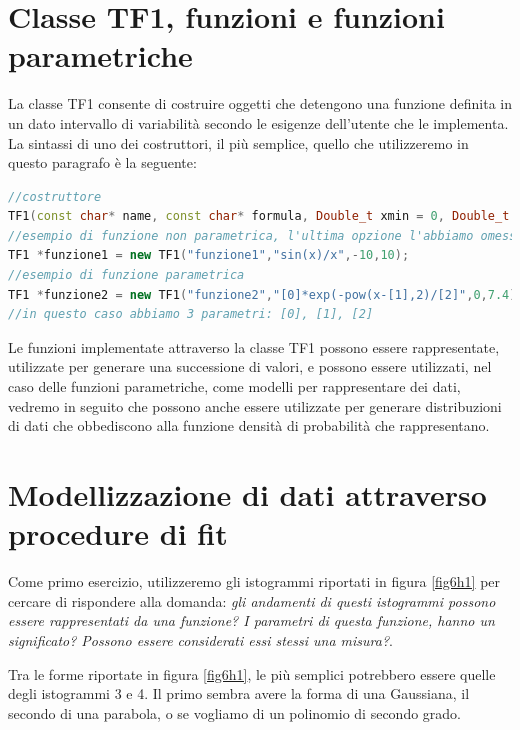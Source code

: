 \documentclass[11pt,fleqn]{book} %
\begin{document}
\section{Classe TF1, funzioni e funzioni parametriche}

La classe TF1 consente di costruire oggetti che detengono una funzione definita in un dato intervallo di variabilità secondo le esigenze dell'utente che le implementa. La sintassi di uno dei costruttori, il più semplice, quello che utilizzeremo in questo paragrafo è la seguente:

\begin{lstlisting}[language=c++]
//costruttore
TF1(const char* name, const char* formula, Double_t xmin = 0, Double_t xmax = 1, TF1::EAddToList addToGlobList = EAddToList::kDefault)
//esempio di funzione non parametrica, l'ultima opzione l'abbiamo omessa e lui assume quella di default.
TF1 *funzione1 = new TF1("funzione1","sin(x)/x",-10,10);
//esempio di funzione parametrica 
TF1 *funzione2 = new TF1("funzione2","[0]*exp(-pow(x-[1],2)/[2]",0,7.4);
//in questo caso abbiamo 3 parametri: [0], [1], [2]
\end{lstlisting}

Le funzioni implementate attraverso la classe TF1 possono essere rappresentate, utilizzate per generare una successione di valori, e possono essere utilizzati, nel caso delle funzioni parametriche, come modelli per rappresentare dei dati, vedremo in seguito che possono anche essere utilizzate  per generare distribuzioni di dati che obbediscono alla funzione densità di probabilità che rappresentano. 



\section{Modellizzazione di dati attraverso procedure di fit}

Come primo esercizio, utilizzeremo gli istogrammi riportati in figura \ref{fig6h1} per cercare di rispondere alla domanda: \textit{gli andamenti di questi istogrammi possono essere rappresentati da una funzione? I parametri di questa funzione, hanno un significato? Possono essere considerati essi stessi una misura?}.

Tra le forme riportate in figura \ref{fig6h1}, le più semplici potrebbero essere quelle degli istogrammi 3 e 4. Il primo sembra avere la forma di una Gaussiana, il secondo di una parabola, o se vogliamo di un polinomio di secondo grado.
\end{document}
